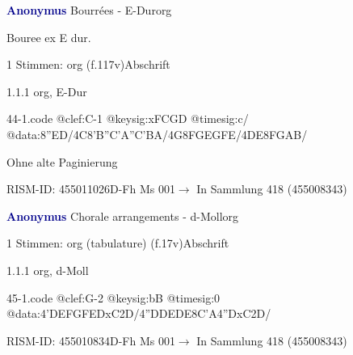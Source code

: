 \documentclass[twocolumn, 12pt]{book}
\begin{document}
\par \vspace{16pt} \textcolor{darkblue}{\textbf{Anonymus  }}\hfillplus{\textbf{[44]}}\newline Bourrées - E-Dur\newline org
\par \begin{itshape}[f.117v, heading:] Bouree ex E dur.\end{itshape} 
\par \textcolor{darkblue}{}  1 Stimmen: org  (f.117v)\newline Abschrift
\par 1.1.1  org, E-Dur  
\begin{filecontents*}{44-1.code}
@clef:C-1
@keysig:xFCGD
@timesig:c/
@data:{8''ED}/4C{8'B''C}{'A''C'BA}/4G{8FG}{EGFE}/4DE{8FGAB}/
\end{filecontents*}
\newline %
\par Ohne alte Paginierung
\par RISM-ID: 455011026\newline D-Fh  Ms 001\newline $\rightarrow$ In Sammlung 418 (455008343)
      
\par \vspace{16pt} \textcolor{darkblue}{\textbf{Anonymus  }}\hfillplus{\textbf{[45]}}\newline Chorale arrangements - d-Moll\newline org
\par \begin{itshape}\end{itshape} 
\par \textcolor{darkblue}{}  1 Stimmen: org (tabulature)  (f.17v)\newline Abschrift
\par 1.1.1  org, d-Moll  
\begin{filecontents*}{45-1.code}
@clef:G-2
@keysig:bB
@timesig:0
@data:4'DEFGFEDxC2D/4''DDEDE{8C'A}4''DxC2D/
\end{filecontents*}
\newline %
\par RISM-ID: 455010834\newline D-Fh  Ms 001\newline $\rightarrow$ In Sammlung 418 (455008343)
      
\end{document}
